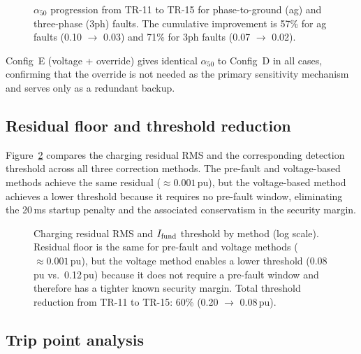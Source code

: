 \documentclass[11pt,a4paper]{article}
\newcommand{\alphafifty}{\alpha_{50}}
\newcommand{\pu}{\,\text{pu}}
\begin{document}
\begin{figure}[h]
  \centering
  \resizebox{0.80\textwidth}{!}{%
  }
  \caption{$\alphafifty$ progression from TR-11 to TR-15 for phase-to-ground
           (ag) and three-phase (3ph) faults.  The cumulative improvement
           is 57\% for ag faults (0.10 $\to$ 0.03) and 71\% for 3ph faults
           (0.07 $\to$ 0.02).}
  \label{fig:alpha50}
\end{figure}

\noindent Config~E (voltage + override) gives identical $\alphafifty$ to
Config~D in all cases, confirming that the override is not needed as the
primary sensitivity mechanism and serves only as a redundant backup.

\subsection{Residual floor and threshold reduction}

Figure~\ref{fig:residual} compares the charging residual RMS and the
corresponding detection threshold across all three correction methods.
The pre-fault and voltage-based methods achieve the same residual ($\approx
0.001\pu$), but the voltage-based method achieves a lower threshold because
it requires no pre-fault window, eliminating the 20\,ms startup penalty and
the associated conservatism in the security margin.

\begin{figure}[h]
  \centering
  \resizebox{0.68\textwidth}{!}{%
  }
  \caption{Charging residual RMS and $I_{\rm fund}$ threshold by method
           (log scale).  Residual floor is the same for pre-fault and
           voltage methods ($\approx 0.001\pu$), but the voltage method
           enables a lower threshold (0.08\,pu vs.\ 0.12\,pu) because it
           does not require a pre-fault window and therefore has a tighter
           known security margin.  Total threshold reduction from TR-11 to
           TR-15: 60\% (0.20 $\to$ 0.08\,pu).}
  \label{fig:residual}
\end{figure}

\subsection{Trip point analysis}
\end{document}
